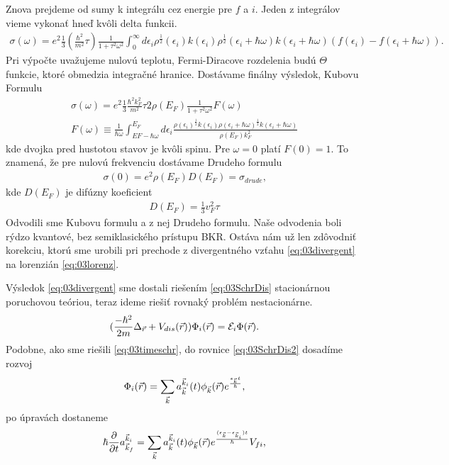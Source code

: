Znova prejdeme od sumy k integrálu cez energie pre $f$ a $i$. Jeden z integrálov vieme vykonať hneď kvôli delta funkcii.
\begin{align}
\sigma(\omega)=e^2\frac{1}{3}(\frac{\hbar^2}{m^2}\tau)\frac{1}{1+\tau^2\omega^2}\int_0^\infty d\epsilon_i\rho^{\frac{1}{2}}(\epsilon_i)k(\epsilon_i)\rho^{\frac{1}{2}}(\epsilon_i+\hbar\omega)k(\epsilon_i+\hbar\omega)(f(\epsilon_i)-f(\epsilon_i+\hbar\omega))\text{.}
\end{align}
Pri výpočte uvažujeme nulovú teplotu, Fermi-Diracove rozdelenia budú $\Theta$ funkcie, ktoré obmedzia integračné hranice. Dostávame finálny výsledok, Kubovu Formulu
\begin{align}
\label{eq:03kubo}
\sigma(\omega)=e^2\frac{1}{3}\frac{\hbar^2k_F^2}{m^2}\tau 2\rho(E_F)\frac{1}{1+\tau^2\omega^2}F(\omega)\\
F(\omega)\equiv\frac{1}{\hbar\omega}\int_{EF-\hbar\omega}^{E_F}d\epsilon_i \frac{\rho(\epsilon_i)^{\frac{1}{2}}k(\epsilon_i)\rho(\epsilon_i+\hbar\omega)^{\frac{1}{2}}k(\epsilon_i+\hbar\omega)}{\rho(E_F)k_F^2}
\end{align}
kde dvojka pred hustotou stavov je kvôli spinu. Pre $\omega=0$ platí $F(0)=1$. To znamená, že pre nulovú frekvenciu dostávame Drudeho formulu
\begin{align}
\sigma(0)=e^2\rho(E_F)D(E_F)=\sigma_{drude} \text{,}
\end{align}
kde $D(E_F)$ je difúzny koeficient
\begin{align}
D(E_F)=\frac{1}{3}v_F^2\tau
\end{align}
Odvodili sme Kubovu formulu a z nej Drudeho formulu. Naše odvodenia boli rýdzo kvantové, bez semiklasického prístupu BKR. Ostáva nám už len zdôvodniť korekciu, ktorú sme urobili pri prechode z divergentného vzťahu \eqref{eq:03divergent} na lorenzián \eqref{eq:03lorenz}.

Výsledok \eqref{eq:03divergent} sme dostali riešením \eqref{eq:03SchrDis} stacionárnou poruchovou teóriou, teraz ideme riešiť rovnaký problém nestacionárne.
\begin{align}
\label{eq:03SchrDis2}
(\frac{-\hbar^2}{2m}\Delta_{\vec{r}} + V_{dis}(\vec{r}))\Phi_i(\vec{r})=\mathcal{E}_i\Phi(\vec{r})  \text{.}
\end{align}
Podobne, ako sme riešili \eqref{eq:03timeschr}, do rovnice \eqref{eq:03SchrDis2} dosadíme rozvoj 
\begin{align}
\Phi_i(\vec{r})=\sum_{\vec{k}}a^{\vec{k}_i}_{\vec{k}}(t)\phi_{\vec{k}}(\vec{r})e^{\frac{\epsilon_{\vec{k}}t}{\hbar}}\text{,}
\end{align}
po úpravách dostaneme
\begin{align}
\hbar \frac{\partial}{\partial t}a^{\vec{k}_i}_{\vec{k}_f}=\sum_{\vec{k}}a^{\vec{k}_i}_{\vec{k}}(t)\phi_{\vec{k}}(\vec{r})e^{\frac{(\epsilon_{\vec{k}}-\epsilon_{\vec{k}_i})t}{\hbar}}V_{fi}\text{,}
\end{align}

